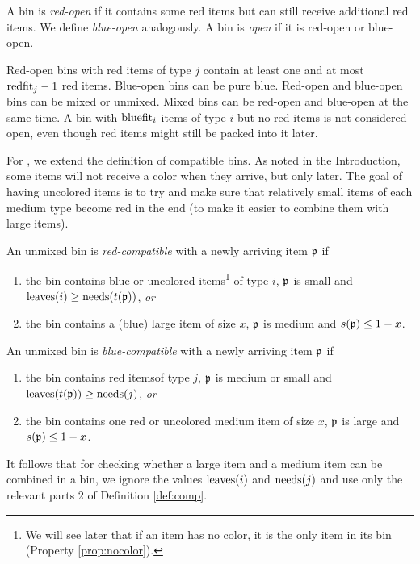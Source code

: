 \begin{definition}
	A bin is \emph{red-open} if it contains some red items but can still receive additional red items. 
	We define \emph{blue-open} analogously. 
	A bin is \emph{open} if it is red-open or blue-open. 
\end{definition}

Red-open bins with red items of type $j$ contain at least one and at most $\mathrm{redfit}_j-1$ red items.
Blue-open bins can be pure blue.
Red-open and blue-open bins can be mixed or unmixed.
Mixed bins can be red-open and blue-open at the same time.
A bin with $\mathrm{bluefit}_i$ items of type $i$ but no red items is not considered open, 
even though red items might still be packed into it later.


For {\EHarm}, we extend the definition of compatible bins.
As noted in the Introduction, some items will not receive a color when they arrive, but only later.
The goal of having uncolored items is to try and make sure that relatively small items of each medium type become red in the end
(to make it easier to combine them with large items).

\begin{definition}
\label{def:comp}
An unmixed bin is \emph{red-compatible} with a newly arriving item $\mathfrak{p}$ if
\begin{enumerate}
\item
the bin contains blue or uncolored items\footnote{\label{fn4}We will see later that if an item has no color, it is the only item in its bin (Property \ref{prop:nocolor}).} of type $i$, $\mathfrak{p}$ is small
and $\mathrm{leaves}(i)\ge \mathrm{needs}(t(\mathfrak{p}))$, \emph{or}
\item
the bin contains a (blue) large item of size $x$, $\mathfrak{p}$ is medium and $s(\mathfrak{p})\le 1-x$.
\end{enumerate}
An unmixed bin is \emph{blue-compatible} with a newly arriving item $\mathfrak{p}$ if
\begin{enumerate}
\item
the bin contains red items\footnotemark[\value{footnote}] of type $j$, $\mathfrak{p}$ is medium or small
and $\mathrm{leaves}(t(\mathfrak{p}))\ge \mathrm{needs}(j)$, \emph{or}
\item
the bin contains one red or uncolored medium item of size $x$, $\mathfrak{p}$ is large and $s(\mathfrak{p})\le 1-x$.
\end{enumerate}
\end{definition}

It follows that for checking whether a large item and a medium item can be combined in a bin, we ignore the values $\mathrm{leaves}(i)$ and $\mathrm{needs}(j)$ and use only the relevant parts 2 of
Definition \ref{def:comp}. 



